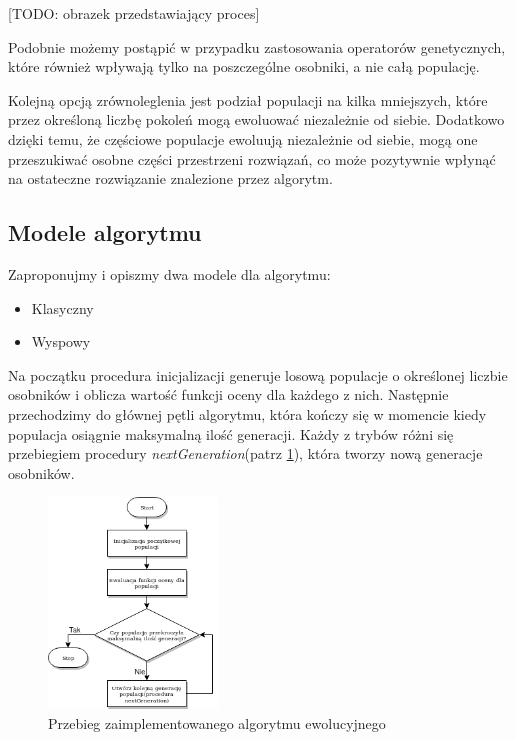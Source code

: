 [TODO: obrazek przedstawiający proces]

Podobnie możemy postąpić w przypadku zastosowania operatorów genetycznych, które również wpływają tylko na poszczególne osobniki, a nie całą 
populację.

Kolejną opcją zrównoleglenia jest podział populacji na kilka mniejszych, które przez określoną liczbę pokoleń mogą ewoluować niezależnie 
od siebie. Dodatkowo dzięki temu, że częściowe populacje ewoluują niezależnie od siebie, mogą one przeszukiwać osobne części przestrzeni 
rozwiązań, co może pozytywnie wpłynąć na ostateczne rozwiązanie znalezione przez algorytm\cite{ISLAND-MODEL-PERFORMANCE}.


\subsection{Modele algorytmu}

Zaproponujmy i opiszmy dwa modele dla algorytmu:
\begin{itemize}
    \item Klasyczny
    \item Wyspowy
\end{itemize}

Na początku procedura inicjalizacji generuje losową populacje o określonej liczbie osobników i oblicza wartość funkcji oceny dla każdego z nich. 
Następnie przechodzimy do głównej pętli algorytmu, która kończy się w momencie kiedy populacja osiągnie maksymalną ilość generacji. 
Każdy z trybów różni się przebiegiem procedury \textit{nextGeneration}(patrz \ref{alg_main_img}), która tworzy nową generacje osobników.

\begin{figure}[H]
    \centering        
    \includegraphics[width=0.4\textwidth]{img/alg_main.png}
    \caption{Przebieg zaimplementowanego algorytmu ewolucyjnego}
    \label{alg_main_img}
\end{figure}

